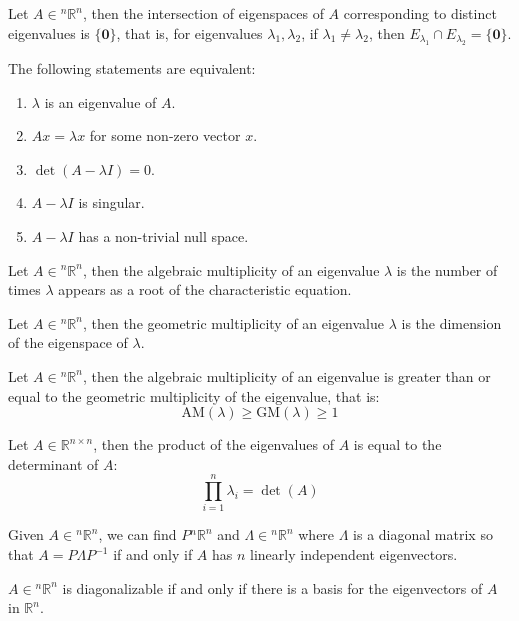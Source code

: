 \documentclass[11pt]{report}
\begin{document}
\begin{theorem}
    Let $A \in {^n\mathbb{R}^n}$, then the intersection of eigenspaces of $A$ corresponding to distinct eigenvalues is $\{\textbf{0}\}$, that is, for eigenvalues $\lambda_1, \lambda_2$, if $\lambda_1 \neq \lambda_2$, then $E_{\lambda_1} \cap E_{\lambda_2} = \{\textbf{0}\}$.
\end{theorem}
\begin{theorem}
    The following statements are equivalent:
    \begin{enumerate}
        \item $\lambda$ is an eigenvalue of $A$.
        \item $Ax = \lambda x$ for some non-zero vector $x$.
        \item $\det(A - \lambda I) = 0$.
        \item $A - \lambda I$ is singular.
        \item $A - \lambda I$ has a non-trivial null space.
    \end{enumerate}
    
\end{theorem}
\begin{definition}
    Let $A \in {^n\mathbb{R}^n}$, then the algebraic multiplicity of an eigenvalue $\lambda$ is the number of times $\lambda$ appears as a root of the characteristic equation.
\end{definition}
\begin{definition}
    Let $A \in {^n\mathbb{R}^n}$, then the geometric multiplicity of an eigenvalue $\lambda$ is the dimension of the eigenspace of $\lambda$.
\end{definition}
\begin{theorem}
    Let $A \in {^n\mathbb{R}^n}$, then the algebraic multiplicity of an eigenvalue is greater than or equal to the geometric multiplicity of the eigenvalue, that is:
    \begin{equation}
        \text{AM}(\lambda) \ge \text{GM}(\lambda) \ge 1
    \end{equation}
\end{theorem}
\begin{theorem}
    Let $A \in \mathbb{R}^{n \times n}$, then the product of the eigenvalues of $A$ is equal to the determinant of $A$:
    \begin{equation}
        \prod_{i=1}^{n} \lambda_i = \det(A)
    \end{equation}
\end{theorem}
\begin{theorem}
    Given $A\in {^n\mathbb{R}^n}$, we can find $P {^n\mathbb{R}^n}$ and $\Lambda \in {^n\mathbb{R}^n}$ where $\Lambda$ is a diagonal matrix so that $A = P\Lambda P^{-1}$ if and only if $A$ has $n$ linearly independent eigenvectors.
\end{theorem}
\begin{theorem}
    $A \in {^n\mathbb{R}^n}$ is diagonalizable if and only if there is a basis for the eigenvectors of $A$ in $\mathbb{R}^n$.
\end{theorem}
\end{document}

